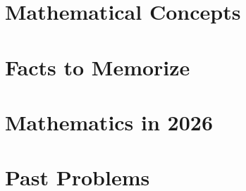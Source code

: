 \documentclass[11pt,oneside]{book}
\begin{document}
    \part{Mathematical Concepts}

    

    \part{Facts to Memorize}

    

    \part{Mathematics in 2026}

    

    \part{Past Problems}

    
\end{document}
